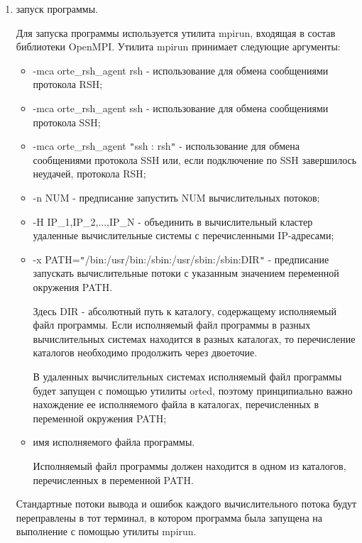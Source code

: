 \begin{enumerate}
	\item запуск программы.

	Для запуска программы используется утилита mpirun, входящая в состав библиотеки OpenMPI. Утилита mpirun принимает следующие аргументы:

	\begin{itemize}

		\item -mca orte\_rsh\_agent rsh - использование для обмена сообщениями протокола RSH;
		\item -mca orte\_rsh\_agent ssh - использование для обмена сообщениями протокола SSH;
		\item -mca orte\_rsh\_agent \verb|"|ssh : rsh\verb|"| - использование для обмена сообщениями протокола SSH или, если подключение по SSH завершилось неудачей, протокола RSH;
		\item -n NUM - предписание запустить NUM вычислительных потоков;
		\item -H IP\_1,IP\_2,...,IP\_N - объединить в вычислительный кластер удаленные вычислительные системы с перечисленными IP-адресами;
		\item -x PATH=\verb|"|/bin:/usr/bin:/sbin:/usr/sbin:/sbin:DIR\verb|"| - предписание запускать вычислительные потоки с указанным значением переменной окружения PATH.

		Здесь DIR - абсолютный путь к каталогу, содержащему исполняемый файл программы. Если исполняемый файл программы в разных вычислительных системах находится в разных каталогах, то перечисление каталогов необходимо продолжить через двоеточие.

		В удаленных вычислительных системах исполняемый файл программы будет запущен с помощью утилиты orted, поэтому принципиально важно нахождение ее исполняемого файла в каталогах, перечисленных в переменной окружения PATH;

		\item имя исполняемого файла программы.

		Исполняемый файл программы должен находится в одном из каталогов, перечисленных в переменной PATH.

	\end{itemize}

	Стандартные потоки вывода и ошибок каждого вычислительного потока будут переправлены в тот терминал, в котором программа была запущена на выполнение с помощью утилиты mpirun.

\end{enumerate}

